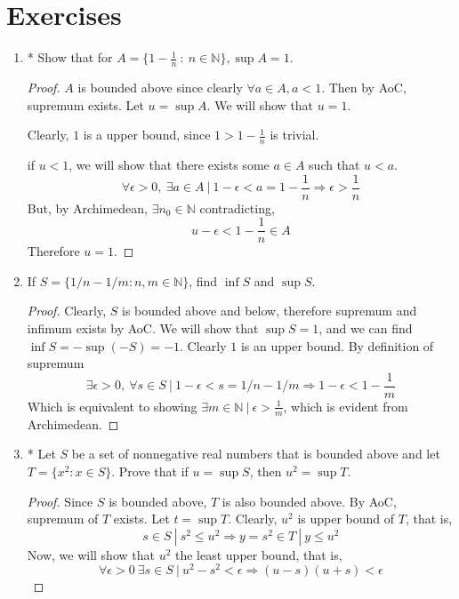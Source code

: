 \section{Exercises}
\begin{enumerate}
    \item* Show that for $ A = \{ 1 - \frac{1}{n} \ : \ n \in \mathbb{N}\}, \sup A = 1$.
        \begin{proof}$A$ is bounded above since clearly $\forall a \in A, a < 1$. Then by AoC,  supremum exists. Let $u = \sup A$. We will show that $ u = 1$.

            Clearly, $1$ is a upper bound, since $1 > 1 - \frac{1}{n}$ is trivial.

            if $u < 1$, we will show that there exists some $a \in A$ such that $u < a$.
            \[ \forall \epsilon > 0, \ \exists a \in A \ | \ 1 - \epsilon < a = 1 - \frac{1}{n} \Rightarrow \epsilon > \frac{1}{n}\]
            But, by Archimedean, $\exists n_0 \in \mathbb{N}$ contradicting,
            \[ u - \epsilon < 1 - \frac{1}{n} \in A\]
            Therefore $u = 1$.
        \end{proof} 
    \item If $S = \{ 1/n - 1/m : n,m \in \mathbb{N}\}$, find $\inf S$ and $\sup S$.
        \begin{proof}
            Clearly, $S$ is bounded above and below, therefore supremum and infimum exists by AoC. We will show that $\sup S = 1$, and we can find $\inf S = - \sup (-S) = -1$.  Clearly $1$ is an upper bound. By definition of supremum
            \[ \exists \epsilon > 0, \ \forall s \in S \ | \ 1 - \epsilon < s = 1/n - 1/m\Rightarrow 1 - \epsilon < 1 - \frac{1}{m}\]
            Which is equivalent to showing $\exists m \in \mathbb{N} \ | \  \epsilon > \frac{1}{m}$, which is evident from Archimedean.
        \end{proof}
    \item* Let $S$ be a set of nonnegative real numbers that is bounded above and let $T = \{ x^2 : x \in S \}$. Prove that if $u = \sup S$, then $u^2 = \sup T$.
    \begin{proof}
        Since $S$ is bounded above, $T$ is also bounded above. By AoC, supremum of $T$ exists. Let $t = \sup T$. Clearly, $u^2$ is upper bound of $T$, that is,
        \[ s \in S \ | \ s^2 \le u^2 \Rightarrow y = s^2 \in T \ | \ y \le u^2\]
        Now, we will show that $u^2$ the least upper bound, that is,
        \[ \forall \epsilon > 0 \ \exists s \in S \ | \ u^2-s^2 < \epsilon \Longrightarrow (u-s)(u+s) < \epsilon\]

\end{proof}
\end{enumerate}
